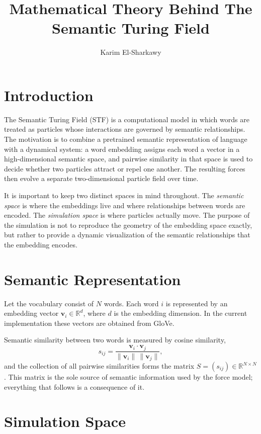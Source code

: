 \documentclass[11pt]{amsart}
\title{Mathematical Theory Behind The Semantic Turing Field}
\author{Karim El-Sharkawy}
\begin{document}
\maketitle

\section{Introduction}

The Semantic Turing Field (STF) is a computational model in which words are
treated as particles whose interactions are governed by semantic relationships.
The motivation is to combine a pretrained semantic representation of language
with a dynamical system: a word embedding assigns each word a vector in a
high-dimensional semantic space, and pairwise similarity in that space is used
to decide whether two particles attract or repel one another. The resulting
forces then evolve a separate two-dimensional particle field over time.

It is important to keep two distinct spaces in mind throughout. The
\emph{semantic space} is where the embeddings live and where relationships
between words are encoded. The \emph{simulation space} is where particles
actually move. The purpose of the simulation is not to reproduce the geometry
of the embedding space exactly, but rather to provide a dynamic visualization
of the semantic relationships that the embedding encodes.

\section{Semantic Representation}

Let the vocabulary consist of $N$ words. Each word $i$ is represented by an
embedding vector $\mathbf{v}_i \in \mathbb{R}^d$, where $d$ is the embedding
dimension. In the current implementation these vectors are obtained from GloVe.

Semantic similarity between two words is measured by cosine similarity,
\begin{equation}
\label{eq:cosine}
s_{ij}
=
\frac{\mathbf{v}_i \cdot \mathbf{v}_j}{\|\mathbf{v}_i\|\,\|\mathbf{v}_j\|},
\end{equation}
and the collection of all pairwise similarities forms the matrix
$S = (s_{ij}) \in \mathbb{R}^{N \times N}$. This matrix is the sole source of
semantic information used by the force model; everything that follows is a
consequence of it.

\section{Simulation Space}
\end{document}

